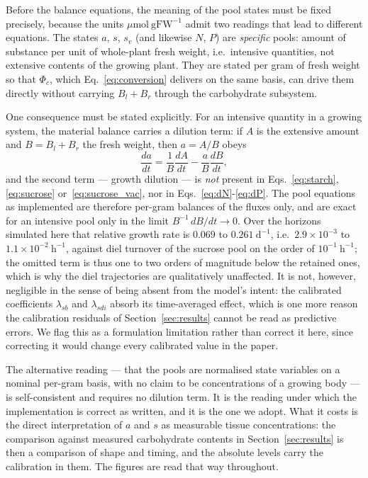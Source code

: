 \documentclass[a4paper,fleqn]{cas-sc}
\begin{document}
Before the balance equations, the meaning of the pool states must be fixed
precisely, because the units $\mu\mathrm{mol\ gFW^{-1}}$ admit two readings
that lead to different equations. The states $a$, $s$, $s_v$ (and likewise
$N$, $P$) are \emph{specific} pools: amount of substance per unit of
whole-plant fresh weight, i.e.\ intensive quantities, not extensive contents
of the growing plant. They are stated per gram of fresh weight so that
$\Phi_c$, which Eq.~\eqref{eq:conversion} delivers on the same basis, can
drive them directly without carrying $B_l+B_r$ through the carbohydrate
subsystem.

One consequence must be stated explicitly. For an intensive quantity in a
growing system, the material balance carries a dilution term: if $A$ is the
extensive amount and $B=B_l+B_r$ the fresh weight, then $a = A/B$ obeys
\begin{equation}
\frac{da}{dt}
= \frac{1}{B}\frac{dA}{dt} - \frac{a}{B}\frac{dB}{dt},
\label{eq:dilution}
\end{equation}
and the second term --- growth dilution --- is \emph{not} present in
Eqs.~\eqref{eq:starch}, \eqref{eq:sucrose} or~\eqref{eq:sucrose_vac}, nor in
Eqs.~\eqref{eq:dN}-\eqref{eq:dP}. The pool equations as implemented are
therefore per-gram balances of the fluxes only, and are exact for an
intensive pool only in the limit $B^{-1}\,dB/dt \to 0$. Over the horizons
simulated here that relative growth rate is $0.069$ to $0.261\
\mathrm{d^{-1}}$, i.e.\ $2.9\times10^{-3}$ to $1.1\times10^{-2}\ \mathrm{h^{-1}}$,
against diel turnover of the sucrose pool on the order of
$10^{-1}\ \mathrm{h^{-1}}$; the omitted term is thus one to two orders of
magnitude below the retained ones, which is why the diel trajectories are
qualitatively unaffected. It is not, however, negligible in the sense of
being absent from the model's intent: the calibrated coefficients
$\lambda_{sb}$ and $\lambda_{sdi}$ absorb its time-averaged effect, which is
one more reason the calibration residuals of Section~\ref{sec:results} cannot
be read as predictive errors. We flag this as a formulation limitation rather
than correct it here, since correcting it would change every calibrated value
in the paper.

The alternative reading --- that the pools are normalised state variables on
a nominal per-gram basis, with no claim to be concentrations of a growing
body --- is self-consistent and requires no dilution term. It is the reading
under which the implementation is correct as written, and it is the one we
adopt. What it costs is the direct interpretation of $a$ and $s$ as
measurable tissue concentrations: the comparison against measured
carbohydrate contents in Section~\ref{sec:results} is then a comparison of
shape and timing, and the absolute levels carry the calibration in them. The
figures are read that way throughout.
\end{document}
